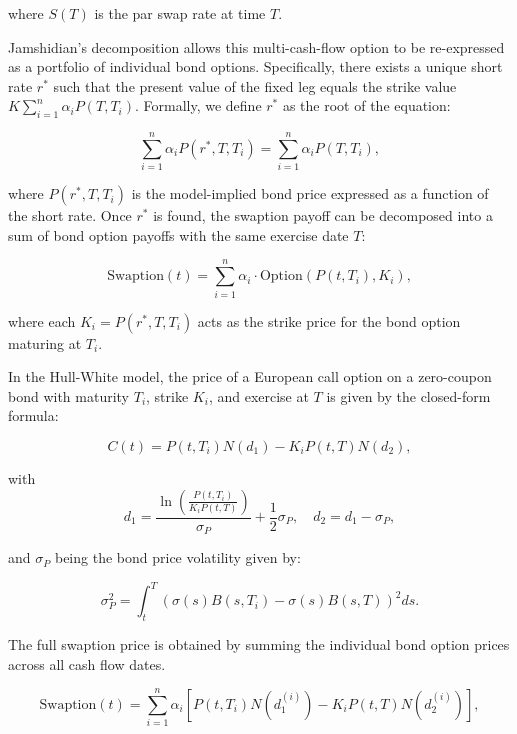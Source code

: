 where \( S(T) \) is the par swap rate at time \( T \).

Jamshidian's decomposition allows this multi-cash-flow option to be re-expressed as a portfolio of individual bond options. Specifically, there exists a unique short rate \( r^* \) such that the present value of the fixed leg equals the strike value \( K \sum_{i=1}^n \alpha_i P(T, T_i) \). Formally, we define \( r^* \) as the root of the equation:

\begin{equation}
\sum_{i=1}^n \alpha_i P(r^*, T, T_i) = \sum_{i=1}^n \alpha_i P(T, T_i),
\end{equation}

where \( P(r^*, T, T_i) \) is the model-implied bond price expressed as a function of the short rate. Once \( r^* \) is found, the swaption payoff can be decomposed into a sum of bond option payoffs with the same exercise date \( T \):

\begin{equation}
\text{Swaption}(t) = \sum_{i=1}^n \alpha_i \cdot \text{Option}(P(t, T_i), K_i),
\end{equation}

where each \( K_i = P(r^*, T, T_i) \) acts as the strike price for the bond option maturing at \( T_i \).

In the Hull-White model, the price of a European call option on a zero-coupon bond with maturity \( T_i \), strike \( K_i \), and exercise at \( T \) is given by the closed-form formula:

\begin{equation}
C(t) = P(t, T_i) N(d_1) - K_i P(t, T) N(d_2),
\end{equation}

with
\begin{equation}
d_1 = \frac{\ln\left( \frac{P(t, T_i)}{K_i P(t, T)} \right)}{\sigma_P} + \frac{1}{2} \sigma_P, \quad
d_2 = d_1 - \sigma_P,
\end{equation}

and \( \sigma_P \) being the bond price volatility given by:

\begin{equation}
\sigma_P^2 = \int_t^T \left( \sigma(s) B(s, T_i) - \sigma(s) B(s, T) \right)^2 ds.
\end{equation}

The full swaption price is obtained by summing the individual bond option prices across all cash flow dates.

\begin{equation}
\text{Swaption}(t) = \sum_{i=1}^n \alpha_i \left[ P(t, T_i) N(d_1^{(i)}) - K_i P(t, T) N(d_2^{(i)}) \right],
\end{equation}

